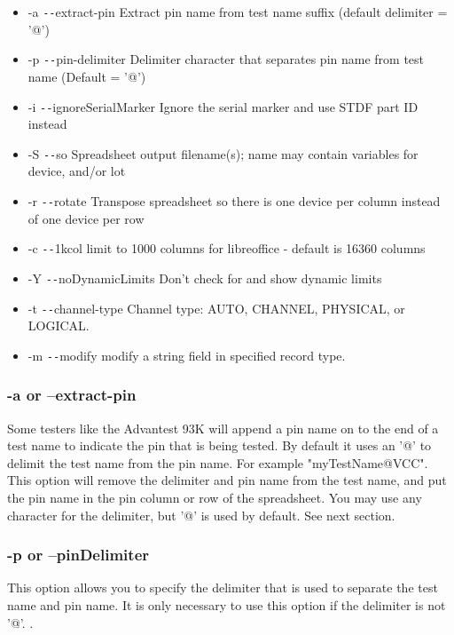 \documentclass[letterpaper]{article}
\begin{document}
\begin{itemize}
\item -a        \texttt{-{}-}extract-pin Extract pin name from test name suffix (default delimiter = '@')
\item -p      \texttt{-{}-}pin-delimiter Delimiter character that separates pin name from test name (Default = '@')
\item -i \texttt{-{}-}ignoreSerialMarker Ignore the serial marker and use STDF part ID instead
\item -S                 \texttt{-{}-}so Spreadsheet output filename(s); name may contain variables for device, and/or lot
\item -r             \texttt{-{}-}rotate Transpose spreadsheet so there is one device per column instead of one device per row
\item -c              \texttt{-{}-}1kcol limit to 1000 columns for libreoffice - default is 16360 columns
\item -Y    \texttt{-{}-}noDynamicLimits Don't check for and show dynamic limits
\item -t       \texttt{-{}-}channel-type Channel type: AUTO, CHANNEL, PHYSICAL, or LOGICAL.
\item -m             \texttt{-{}-}modify modify a string field in specified record type.
\end{itemize}

\subsubsection{\bf -a or --extract-pin}
Some testers like the Advantest 93K will append a pin name on to the end of a test name
to indicate the pin that is being tested.  By default it uses an \makeatletter '@' \makeatother
to delimit the test name from the pin name.  For example \makeatletter "myTestName@VCC". \makeatother
This option will remove the delimiter and pin name from the test name, and put the pin name
in the pin column or row of the spreadsheet.  You may use any character for the delimiter,
but \makeatletter '@' \makeatother is used by default.  See next section.

\subsubsection{\bf -p or --pinDelimiter}
This option allows you to specify the delimiter that is used to separate the test name and pin name.
It is only necessary to use this option if the delimiter is not \makeatletter '@'. \makeatother.
\clearpage
\end{document}
